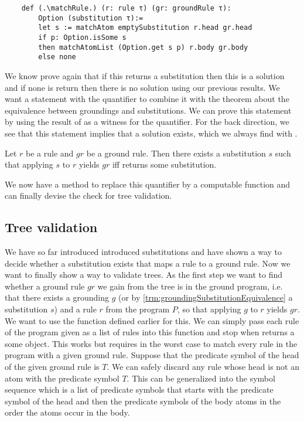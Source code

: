 \begin{lstlisting}
    def (.\matchRule.) (r: rule τ) (gr: groundRule τ):
        Option (substitution τ):=
        let s := matchAtom emptySubstitution r.head gr.head
        if p: Option.isSome s
        then matchAtomList (Option.get s p) r.body gr.body
        else none

\end{lstlisting}

We know prove again that if this returns a substitution then this is a solution and if none is return then there is no solution using our previous results. 
We want a statement with the quantifier to combine it with the theorem about the equivalence between groundings and substitutions. We can prove this statement by using the result of \matchRule as a witness for the quantifier. For the back direction, we see that this statement implies that a solution exists, which we always find with \matchRule.

\begin{theorem}[\matchRuleIsSomeIffSolution]\label{trm:matchRule}
Let $r$  be a rule and $gr$ be a ground rule. Then there exists a substitution $s$ such that applying $s$ to $r$ yields $gr$ iff \matchRule returns some substitution.
\end{theorem}


We now have a method to replace this quantifier by a computable function and can finally devise the check for tree validation.

\subsection{Tree validation}

We have so far introduced introduced substitutions and have shown a way to decide whether a substitution exists that maps a rule to a ground rule. Now we want to finally show a way to validate trees. As the first step we want to find whether a ground rule $gr$ we gain from the tree is in the ground program, i.e. that there exists a grounding $g$ (or by \cref{trm:groundingSubstitutionEquivalence} a substitution $s$) and a rule $r$ from the program $P$, so that applying $g$ to $r$ yields $gr$. We want to use the \matchRule function defined earlier for this. 
We can simply pass each rule of the program given as a list of rules into this function and stop when \matchRule returns a some object. This works but requires in the worst case to match every rule in the program with a given ground rule. Suppose that the predicate symbol of the head of the given ground rule is $T$. We can safely discard any rule whose head is not an atom with the predicate symbol $T$. This can be generalized into the symbol sequence which is a list of predicate symbols that starts with the predicate symbol of the head and then the predicate symbols of the body atoms in the order the atoms occur in the body.

